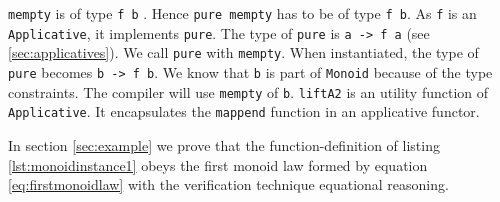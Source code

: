 \verb|mempty| is of type \verb|f b| . Hence \verb|pure mempty| has to be of type \verb|f b|.
As \verb|f| is an \verb|Applicative|, it implements \verb|pure|. The type of \verb|pure| is \verb|a -> f a| (see \ref{sec:applicatives}). We call \verb|pure| with \verb|mempty|. When instantiated, the type of \verb|pure| becomes \verb|b -> f b|. We know that \verb|b| is part of \verb|Monoid| because of the type constraints. The compiler will use \verb|mempty| of \verb|b|.  \verb|liftA2| is an utility function of \verb|Applicative|. It encapsulates the \verb|mappend| function in an applicative functor. 

In section \ref{sec:example} we prove that the \gls{function-definition} of listing \ref{lst:monoidinstance1} obeys the first monoid law formed by equation \ref{eq:firstmonoidlaw} with  the verification technique equational reasoning.


